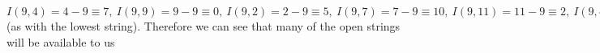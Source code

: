 \documentclass[preview]{standalone}
\begin{document}
\begin{center}
$I(9, 4) = 4 - 9 \equiv 7, \ I(9, 9) = 9 - 9 \equiv 0, \ I(9, 2) = 2 - 9 \equiv 5, \ I(9, 7) = 7 - 9 \equiv 10, \ I(9, 11) = 11 - 9 \equiv 2, \ I(9, 4) = 4 - 9 \equiv 7$ (as with the lowest string). Therefore we can see that many of the open strings will be available to us
\end{center}
\end{document}
